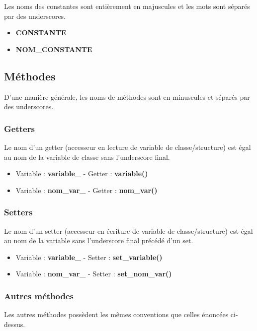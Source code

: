 \documentclass[]{article}
\begin{document}
Les noms des constantes sont entièrement en majuscules et les mots sont
séparés par des underscores.

\begin{itemize}
	\item \textbf{CONSTANTE}
	\item \textbf{NOM\_CONSTANTE}
\end{itemize}

\subsection{Méthodes}

D'une manière générale, les noms de méthodes sont en minuscules et
séparés par des underscores.

\subsubsection{Getters}

Le nom d'un getter (accesseur en lecture de variable de classe/structure)
est égal au nom 
de la variable de classe sans l'underscore final.

\begin{itemize}
	\item Variable : \textbf{variable\_} - Getter : \textbf{variable()}
	\item Variable : \textbf{nom\_var\_} - Getter : \textbf{nom\_var()}
\end{itemize}

\subsubsection{Setters}

Le nom d'un setter (accesseur en écriture de variable de classe/structure)
est égal au nom de la variable sans l'underscore final précédé
d'un set.

\begin{itemize}
	\item Variable : \textbf{variable\_} - Setter : \textbf{set\_variable()}
	\item Variable : \textbf{nom\_var\_} - Setter : \textbf{set\_nom\_var()}
\end{itemize}

\subsubsection{Autres méthodes}

Les autres méthodes possèdent les mêmes conventions que celles
énoncées ci-dessus.
\end{document}
